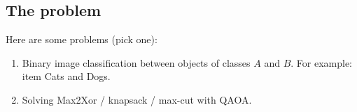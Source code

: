 \subsection{The problem}
Here are some problems (pick one):
\begin{enumerate}
    \item Binary image classification between objects of classes $A$ and $B$. For example: item Cats and Dogs.
    \item Solving Max2Xor / knapsack / max-cut with QAOA.
\end{enumerate}